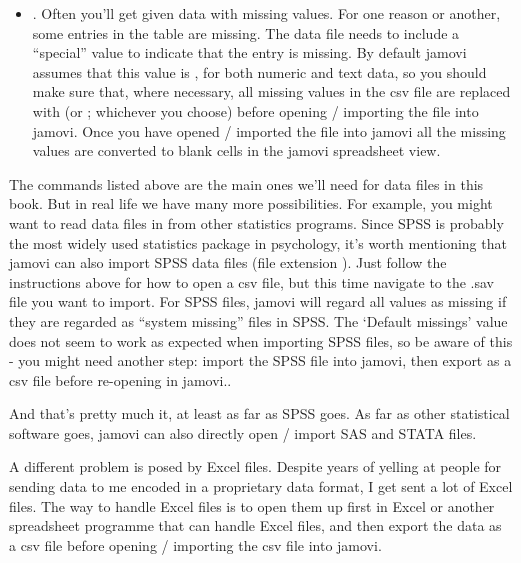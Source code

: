 \begin{itemize}
\item {}. Often you'll get given data with missing values. For one reason or another, some entries in the table are missing. The data file needs to include a ``special'' value to indicate that the entry is missing. By default jamovi assumes that this value is , for both numeric and text data, so you should make sure that, where necessary, all missing values in the csv file are replaced with  (or ; whichever you choose) before opening / importing the file into jamovi. Once you have opened / imported the file into jamovi all the missing values are converted to blank cells in the jamovi spreadsheet view.
\end{itemize}


The commands listed above are the main ones we'll need for data files in this book. But in real life we have many more possibilities. For example, you might want to read data files in from other statistics programs. Since SPSS is probably the most widely used statistics package in psychology, it's worth mentioning that jamovi can also import SPSS data files (file extension ). Just follow the instructions above for how to open a csv file, but this time navigate to the .sav file you want to import. For SPSS files, jamovi will regard all values as missing if they are regarded as ``system missing'' files in SPSS. The `Default missings' value does not seem to work as expected when importing SPSS files, so be aware of this - you might need another step: import the SPSS file into jamovi, then export as a csv file before re-opening in jamovi..

And that's pretty much it, at least as far as SPSS goes.  As far as other statistical software goes, jamovi can also directly open / import SAS and STATA files. 


A different problem is posed by Excel files. Despite years of yelling at people for sending data to me encoded in a proprietary data format, I get sent a lot of Excel files. The way to handle Excel files is to open them up first in Excel or another spreadsheet programme that can handle Excel files, and then export the data as a csv file before opening / importing the csv file into jamovi. 


